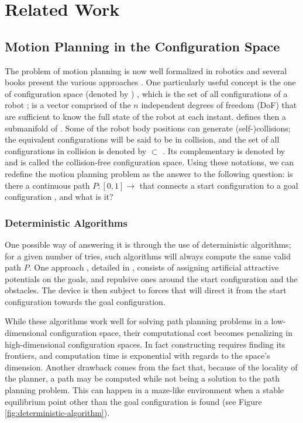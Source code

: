 \section{Related Work}
\label{sec:chap1-related-work}

\subsection{Motion Planning in the Configuration Space}

The problem of motion planning is now well formalized in robotics and
several books present the various approaches
\cite{lato91,chos05,lava06}. One particularly useful concept is the
one of configuration space (denoted by \cspace) \cite{loza83}, which
is the set of all configurations \config{} of a robot \robot; \config{} is
a vector comprised of the $n$ independent degrees of freedom (DoF)
that are sufficient to know the full state of the robot at each
instant. \cspace defines then a submanifold of \espace. Some of the
robot body positions can generate (self-)collisions; the equivalent
configurations will be said to be in collision, and the set of all
configurations in collision is denoted by \cobs $\subset$ \cspace. Its
complementary is denoted by \cfree and is called the collision-free
configuration space. Using these notations, we can redefine the motion
planning problem as the answer to the following question: is there a
continuous path $P: [0,1] \rightarrow$ \cfree that connects a start
configuration  to a goal configuration , and what
is it?

\subsubsection{Deterministic Algorithms}
\label{subsubsec:chap1-deterministic algorithms}

One possible way of answering it is through the use of deterministic
algorithms; for a given number of tries, such algorithms will always
compute the same valid path $P$. One approach , detailed in
\cite{khat85}, consists of assigning artificial attractive potentials
on the goals, and repulsive ones around the start configuration and
the obstacles. The device is then subject to forces that will direct
it from the start configuration towards the goal configuration.

While these algorithms work well for solving path planning problems
in a low-dimensional configuration space, their computational cost
becomes penalizing in high-dimensional configuration spaces. In fact
constructing \cfree requires finding its frontiers, and computation
time is exponential with regards to the space's dimension. Another
drawback comes from the fact that, because of the locality of the
planner, a path may be computed while not being a solution to the
path planning problem. This can happen in a maze-like environment
when a stable equilibrium point other than the goal configuration
is found (see Figure \autoref{fig:deterministic-algorithm}).

